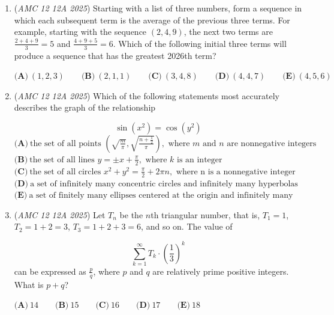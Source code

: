 \begin{enumerate}
 In centimeters, how much of the pole height is needed for the ribbon to wrap around exactly once?


 $\textbf{(A)}\   \frac{15}{2}  \qquad                 \textbf{(B)}\   8  \qquad                 \textbf{(C)}\   10  \qquad                 \textbf{(D)}\   \frac{25}{2}  \qquad                 \textbf{(E)}\   \frac{40}{3}$


	\item (\textit{AMC 12 12A 2025}) Starting with a list of three numbers, form a sequence in which each subsequent term is the average of the previous three terms. For example, starting with the sequence $(2,4,9)$, the next two terms are $\frac{2+4+9}{3} = 5$ and $\frac{4+9+5}{3} = 6$. Which of the following initial three terms will produce a sequence that has the greatest 2026th term?


 $\textbf{(A)}\   (1,2,3)  \qquad                 \textbf{(B)}\   (2,1,1)  \qquad                 \textbf{(C)}\   (3,4,8)  \qquad                 \textbf{(D)}\   (4,4,7)  \qquad                 \textbf{(E)}\   (4,5,6)$


	\item (\textit{AMC 12 12A 2025}) Which of the following statements most accurately describes the graph of the relationship

 \[\sin\left( x^{2} \right) = \cos\left( y^{2} \right)\]
$\textbf{(A)}\   \text{the set of all points } \left( \sqrt{ \frac{m}{\pi}}, \sqrt{\frac{n + \frac{1}{2}}{\pi}} \right), \text{ where } m \text{ and } n \text{ are nonnegative integers}$
$\textbf{(B)}\   \text{the set of all lines } y = \pm x + \frac{\pi}{2}, \text{ where } k \text{ is an integer}$
$\textbf{(C)}\   \text{the set of all circles } x^{2} + y^{2} = \frac{\pi}{2} + 2 \pi n, \text{ where n is a nonnegative integer}$
$\textbf{(D)}\   \text{a set of infinitely many concentric circles and infinitely many hyperbolas}$
$\textbf{(E)}\   \text{a set of finitely many ellipses centered at the origin and infinitely many parabolas}$


	\item (\textit{AMC 12 12A 2025}) Let $T_{n}$ be the $n$th triangular number, that is, $T_{1} = 1$, $T_{2} = 1+2 = 3$, $T_{3} = 1+2+3 = 6$, and so on. The value of

 \[\sum_{k=1}^{\infty} T_{k} \cdot \left( \frac{1}{3} \right)^{k}\]
can be expressed as $\frac{p}{q}$, where $p$ and $q$ are relatively prime positive integers. What is $p+q$?


 $\textbf{(A)}\   14  \qquad                 \textbf{(B)}\   15  \qquad                 \textbf{(C)}\   16  \qquad                 \textbf{(D)}\   17  \qquad                 \textbf{(E)}\   18$



\end{enumerate}
